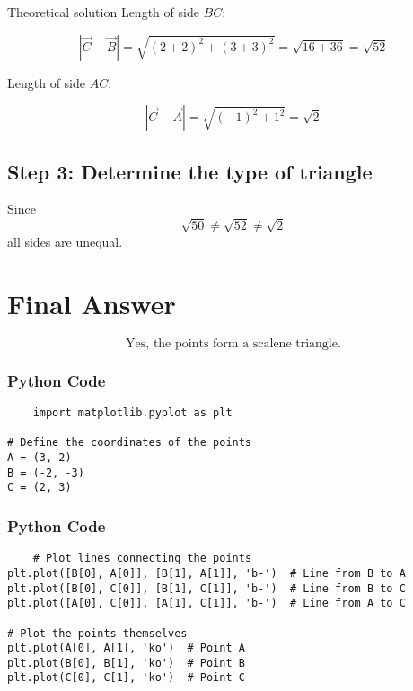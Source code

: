 \documentclass{beamer}
\begin{document}
\begin{frame}{Theoretical solution}
Length of side \(BC\):

\begin{equation}
|\vec{C} - \vec{B}| = \sqrt{(2 + 2)^2 + (3 + 3)^2} = \sqrt{16 + 36} = \sqrt{52} \tag{7}
\end{equation}

Length of side \(AC\):

\begin{equation}
|\vec{C} - \vec{A}| = \sqrt{(-1)^2 + 1^2} = \sqrt{2} \tag{8}
\end{equation}



\subsection*{Step 3: Determine the type of triangle}

Since
\[
\sqrt{50} \neq \sqrt{52} \neq \sqrt{2}
\]
all sides are unequal.

\section*{Final Answer}

\[
\boxed{
\text{Yes, the points form a scalene triangle.}
}
\]
\end{frame}

\begin{frame}[fragile]
    \frametitle{Python Code}
    \begin{lstlisting}
    import matplotlib.pyplot as plt

# Define the coordinates of the points
A = (3, 2)
B = (-2, -3)
C = (2, 3)

\end{lstlisting}
\end{frame}

\begin{frame}[fragile]
    \frametitle{Python Code}
    \begin{lstlisting}
    # Plot lines connecting the points
plt.plot([B[0], A[0]], [B[1], A[1]], 'b-')  # Line from B to A
plt.plot([B[0], C[0]], [B[1], C[1]], 'b-')  # Line from B to C
plt.plot([A[0], C[0]], [A[1], C[1]], 'b-')  # Line from A to C

# Plot the points themselves
plt.plot(A[0], A[1], 'ko')  # Point A
plt.plot(B[0], B[1], 'ko')  # Point B
plt.plot(C[0], C[1], 'ko')  # Point C

\end{lstlisting}
\end{frame}
\end{document}
